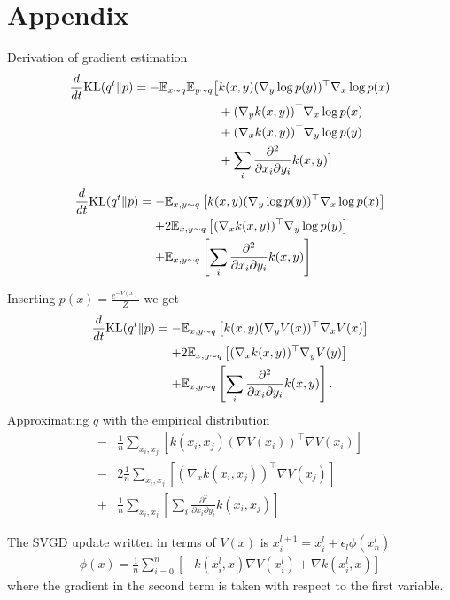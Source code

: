 \documentclass{article}
\begin{document}
\section{Appendix}
Derivation of gradient estimation
\begin{align}
    \frac{d}{dt} \textrm{KL}( q^t \| p ) = - \mathbb{E}_{x\sim q} \mathbb{E}_{y \sim q} \big[
        & k(x,y) (\nabla_y \log p(y))^\top \nabla_x \log p(x) \\
        &+ (\nabla_y k(x,y) )^\top \nabla_x \log p(x) \\
        &+ (\nabla_x k(x,y) )^\top \nabla_y \log p(y) \\
        &+ \sum_i \frac{ \partial^2 }{ \partial x_i \partial y_i } k(x,y) \big]
\end{align}
\begin{align}
    \frac{d}{dt} \textrm{KL}( q^t \| p ) =
    -& \mathbb{E}_{x,y\sim q} \left[ k(x,y) (\nabla_y \log p(y))^\top \nabla_x \log p(x) \right] \\ 
    +& 2 \mathbb{E}_{x,y\sim q} \left[ (\nabla_x k(x,y) )^\top \nabla_y \log p(y) \right] \\ 
    +& \mathbb{E}_{x,y\sim q} \left[ \sum_i \frac{ \partial^2 }{ \partial x_i \partial y_i } k(x,y) \right]
\end{align}

Inserting $p(x) = \frac{e^{-V(x)}}{Z}$ we get
\begin{align}
    \frac{d}{dt} \textrm{KL}( q^t \| p ) =
    -& \mathbb{E}_{x,y\sim q} \left[ k(x,y) (\nabla_y V(x))^\top \nabla_x V(x) \right] \\ 
    +& 2 \mathbb{E}_{x,y\sim q} \left[ (\nabla_x k(x,y) )^\top \nabla_y V(y) \right] \\ 
    +& \mathbb{E}_{x,y\sim q} \left[ \sum_i \frac{ \partial^2 }{ \partial x_i \partial y_i } k(x,y) \right]
    .
\end{align}
Approximating $q$ with the empirical distribution
\begin{align}
    -& \frac{1}{n}\sum_{x_i,x_j} \left[ k(x_i,x_j) (\nabla V(x_i))^\top \nabla V(x_i) \right] \\ 
    -& 2 \frac{1}{n}\sum_{x_i,x_j} \left[ (\nabla_x k(x_i,x_j) )^\top \nabla V(x_j) \right] \\ 
    +& \frac{1}{n}\sum_{x_i,x_j} \left[ \sum_i \frac{ \partial^2 }{ \partial x_i \partial y_i } k(x_i,x_j) \right]
\end{align}

The SVGD update written in terms of $V(x)$ is $x_i^{l+1} = x_i^l + \epsilon_l \phi(x_n^l)$
\begin{align}
    \phi(x) = \frac{1}{n} \sum_{i=0}^{n} \left[
        - k(x_i^l, x) \nabla V(x_i^l) + \nabla k(x_i^l, x)
    \right]
\end{align}
where the gradient in the second term is taken with respect to the first variable.
\end{document}
